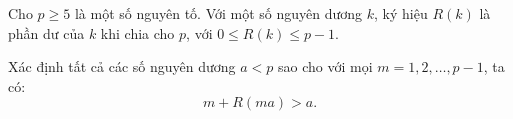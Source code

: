 \ifshowproblem
\begin{problem}\label{example:RMM-2015-P5}
    Cho \( p \ge 5 \) là một số nguyên tố. Với một số nguyên dương \( k \), ký hiệu \( R(k) \) là phần dư của \( k \) khi chia cho \( p \),
    với \( 0 \le R(k) \le p - 1 \).

    Xác định tất cả các số nguyên dương \( a < p \) sao cho với mọi \( m = 1, 2, \ldots, p - 1 \), ta có:
    \[
        m + R(ma) > a.
    \]
\end{problem}
\fi

\fi